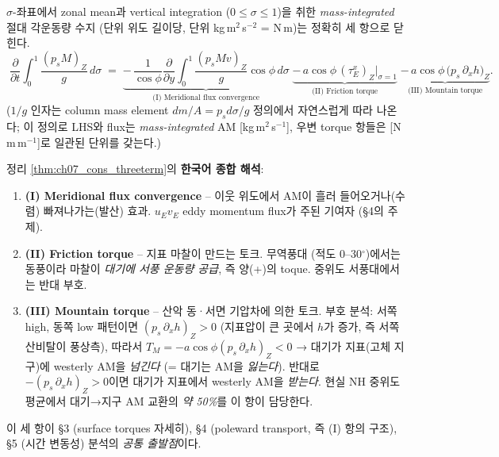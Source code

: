 \begin{theorem}\label{thm:ch07_cons_threeterm}
$\sigma$-좌표에서 zonal mean과 vertical integration ($0 \le \sigma \le 1$)을
취한 \emph{mass-integrated} 절대 각운동량 수지 (단위 위도 길이당, 단위
kg\,m$^2$\,s$^{-2}$ = N\,m)는 정확히 세 항으로 닫힌다.
\begin{equation}\label{eq:ch07_cons_threeterm}
  \boxed{\;
  \frac{\partial}{\partial t}\!\!\int_0^1\!\!\frac{(p_s M)_Z}{g}\,d\sigma
  \;=\;
  \underbrace{-\,\frac{1}{\cos\phi}\frac{\partial}{\partial y}\!\!\int_0^1\!
              \frac{(p_s M v)_Z}{g}\cos\phi\,d\sigma}_{\text{(I) Meridional flux convergence}}
  \;\underbrace{-\,a\cos\phi\,(\tau_E^x)_Z\big|_{\sigma=1}}_{\text{(II) Friction torque}}
  \;\underbrace{-\,a\cos\phi\,\bigl(p_s\,\partial_x h\bigr)_Z}_{\text{(III) Mountain torque}}.
  \;}
\end{equation}
($1/g$ 인자는 column mass element $dm/A = p_s d\sigma/g$ 정의에서
자연스럽게 따라 나온다; 이 정의로 LHS와 flux는 \emph{mass-integrated} AM
[kg\,m$^2$\,s$^{-1}$], 우변 torque 항들은 [N\,m\,m$^{-1}$]로 일관된 단위를
갖는다.)
\end{theorem}


\begin{hisublock}
정리 \ref{thm:ch07_cons_threeterm}의 \textbf{한국어 종합 해석}:
\begin{enumerate}
  \item \textbf{(I) Meridional flux convergence} -- 이웃 위도에서 AM이 흘러
        들어오거나(수렴) 빠져나가는(발산) 효과.  $u_E v_E$ eddy momentum flux가
        주된 기여자 (\S4의 주제).
  \item \textbf{(II) Friction torque} -- 지표 마찰이 만드는 토크.  무역풍대
        (적도 0--30$^\circ$)에서는 동풍이라 마찰이 \emph{대기에 서풍 운동량
        공급}, 즉 양(+)의 toque.  중위도 서풍대에서는 반대 부호.
  \item \textbf{(III) Mountain torque} -- 산악 동·서면 기압차에 의한 토크.
        부호 분석: 서쪽 high, 동쪽 low 패턴이면 $(p_s\,\partial_x h)_Z > 0$
        (지표압이 큰 곳에서 $h$가 증가, 즉 서쪽 산비탈이 풍상측),
        따라서 $T_M = -a\cos\phi(p_s\,\partial_x h)_Z < 0$ → 대기가 지표(고체
        지구)에 westerly AM을 \emph{넘긴다} (= 대기는 AM을 \emph{잃는다}).
        반대로 $-(p_s\,\partial_x h)_Z > 0$이면 대기가 지표에서 westerly AM을
        \emph{받는다}.  현실 NH 중위도 평균에서 대기→지구 AM 교환의
        \emph{약 50\%}를 이 항이 담당한다.
\end{enumerate}
\smallskip
이 세 항이 \S3 (surface torques 자세히), \S4 (poleward transport, 즉 (I) 항의
구조), \S5 (시간 변동성) 분석의 \emph{공통 출발점}이다.
\end{hisublock}

